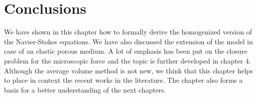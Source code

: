 \section{Conclusions}
We have shown in this chapter how to formally derive the homogenized version of the Navier-Stokes equations. We have also discussed the extension of the model in case of an elastic porous medium. A lot of emphasis has been put on the closure problem for the microscopic force and the topic is further developed in chapter 4.
Although the average volume method is not new, we think that this chapter helps to place in context the recent works in the literature. The chapter also forms a basis for a better understanding of the next chapters.

